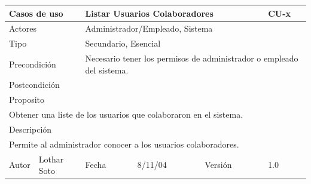 \documentclass{article}
\begin{document}
\begin{table}[h]
\begin{tabular}{|l|l|l|l|l|l|}
\hline
\multicolumn{2}{|p{2cm}|}{Casos de uso}  & \multicolumn{3}{p{7cm}|}{Listar Usuarios Colaboradores} & CU-x \\
\hline
\multicolumn{2}{|p{2cm}|}{Actores}       & \multicolumn{4}{p{8cm}|}{Administrador/Empleado, Sistema}        \\
\hline
\multicolumn{2}{|p{2cm}|}{Tipo}          & \multicolumn{4}{p{8cm}|}{Secundario, Esencial}        \\
\hline
\multicolumn{2}{|p{2cm}|}{Precondición}  & \multicolumn{4}{p{8cm}|}{Necesario tener los permisos de administrador o empleado del sistema.}        \\
\hline
\multicolumn{2}{|p{2cm}|}{Postcondición} & \multicolumn{4}{p{8cm}|}{}        \\
\hline
\multicolumn{6}{|p{10cm}|}{Proposito}                                   \\
\hline
\multicolumn{6}{|p{10cm}|}{Obtener una liste de los usuarios que colaboraron en el sistema.}                                            \\
\hline
\multicolumn{6}{|p{10cm}|}{Descripción}                                 \\
\hline
\multicolumn{6}{|p{10cm}|}{Permite al administrador conocer a los usuarios colaboradores.}                                            \\
\hline
Autor          &       Lothar Soto        & Fecha    &  8/11/04   &   Versión  & 1.0\\    
\hline
\end{tabular}
\end{table}
\end{document}
